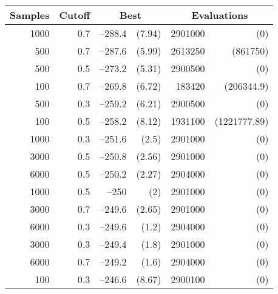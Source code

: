 \begin{table}
\centering
\caption{}
\begin{tabular}{|r|r|rr|rr|}
\hline
\multicolumn{1}{|c|}{Samples} & \multicolumn{1}{c|}{Cutoff} &
 \multicolumn{2}{c|}{Best} & 
 \multicolumn{2}{c|}{Evaluations}  \\ \hline
1000 & 0.7 & --288.4 & (7.94) & 2901000 & (0) \\ \hline
500 & 0.7 & --287.6 & (5.99) & 2613250 & (861750) \\ \hline
500 & 0.5 & --273.2 & (5.31) & 2900500 & (0) \\ \hline
100 & 0.7 & --269.8 & (6.72) & 183420 & (206344.9) \\ \hline
500 & 0.3 & --259.2 & (6.21) & 2900500 & (0) \\ \hline
100 & 0.5 & --258.2 & (8.12) & 1931100 & (1221777.89) \\ \hline
1000 & 0.3 & --251.6 & (2.5) & 2901000 & (0) \\ \hline
3000 & 0.5 & --250.8 & (2.56) & 2901000 & (0) \\ \hline
6000 & 0.5 & --250.2 & (2.27) & 2904000 & (0) \\ \hline
1000 & 0.5 & --250 & (2) & 2901000 & (0) \\ \hline
3000 & 0.7 & --249.6 & (2.65) & 2901000 & (0) \\ \hline
6000 & 0.3 & --249.6 & (1.2) & 2904000 & (0) \\ \hline
3000 & 0.3 & --249.4 & (1.8) & 2901000 & (0) \\ \hline
6000 & 0.7 & --249.2 & (1.6) & 2904000 & (0) \\ \hline
100 & 0.3 & --246.6 & (8.67) & 2900100 & (0) \\ \hline
\end{tabular}
\label{ce-1d-ising}
\end{table}


